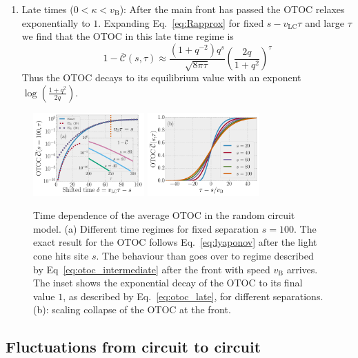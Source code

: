 \documentclass[aps,prb,twocolumn,superscriptaddress]{revtex4-1}
\begin{document}
\begin{enumerate}
\item Late times ($0<\kappa< v_{\text{B}}$): After the main front has passed the OTOC relaxes exponentially to $1$. Expanding Eq.~\eqref{eq:Rapprox} for fixed $s-v_{\text{LC}} \tau$ and large $\tau$ we find that the OTOC in this late time regime is 
\begin{equation}\label{eq:otoc_late}
1-\overline{\mathcal{C}}(s,\tau)  \approx\frac{(1+q^{-2})q^{s}}{\sqrt{8\pi \tau}}\left(\frac{2q}{1+q^{2}}\right)^{\tau}
\end{equation}
Thus the OTOC decays to its equilibrium value with an exponent $\log(\frac{1+q^{2}}{2q})$.

\end{enumerate}
 \begin{figure}[h!]
 \centering
  	\includegraphics[width=0.38\textwidth]{otoc_regimes.pdf} 
  	\includegraphics[width=0.38\textwidth]{otoc_scaling_collapse.pdf}
\caption{Time dependence of the average OTOC in the random circuit model. (a) Different time regimes for fixed separation $s=100$. The exact result for the OTOC follows Eq.~\eqref{eq:lyaponov} after the light cone hits site $s$. The behaviour than goes over to regime described by Eq~\eqref{eq:otoc_intermediate} after the front with speed $v_{\text{B}}$ arrives. The inset shows the exponential decay of the OTOC to its final value $1$, as described by Eq.~\eqref{eq:otoc_late}, for different separations. (b): scaling collapse of the OTOC at the front.}
 \label{fig:random_circuit_otoc}
 \end{figure}
 
\subsection{Fluctuations from circuit to circuit}\label{ss:fluct}
\end{document}
